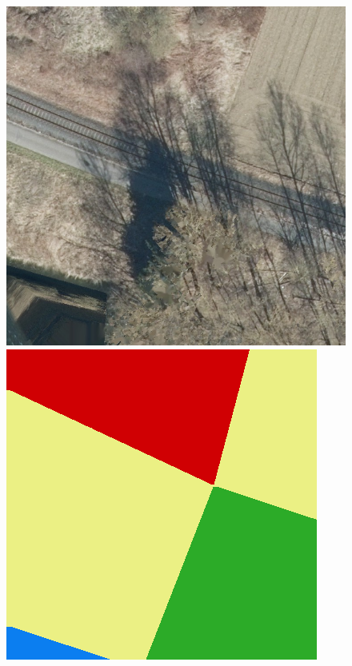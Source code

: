 \begin{figure}
    \vspace{3mm}
    \includegraphics[width=\UnetPredictionsImageWidth]{images/unet/114975-image} \hfill
    \includegraphics[width=\UnetPredictionsImageWidth]{images/unet/114975-label} \hfill

\end{figure}
